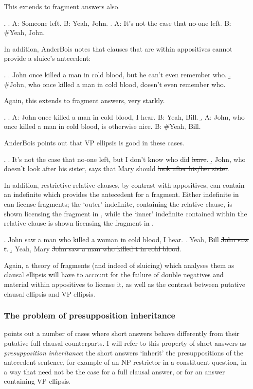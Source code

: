 \documentclass[doublespace]{umthesis}
\begin{document}
This extends to fragment answers also.

\ex. 	\a. A: Someone left. B: Yeah, John.
	\b. A: It's not the case that no-one left. B: \#Yeah, John.
	
In addition, AnderBois notes that clauses that are within appositives cannot provide a sluice's antecedent:
		
\ex. 		\label{appossluicing}
		\a. \label{appossluicinga}John once killed a man in cold blood, but he can't even remember who.
		\b. \label{appossluicingb}\#John, who once killed a man in cold blood, doesn't even remember who.

Again, this extends to fragment answers, very starkly.

\ex. 	\a. A: John once killed a man in cold blood, I hear. B: Yeah, Bill.
	\b. A: John, who once killed a man in cold blood, is otherwise nice. B: \#Yeah, Bill.

AnderBois points out that VP ellipsis is good in these cases.
  
  \ex. 	\a. It's not the case that no-one left, but I don't know who did \sout{leave}.
  	\b. John, who doesn't look after his sister, says that Mary should \sout{look after his/her sister}.

In addition, restrictive relative clauses, by contrast with appositives, can contain an indefinite which provides the antecedent for a fragment. Either indefinite in \Next can license fragments; the `outer' indefinite, containing the relative clause, is shown licensing the fragment in \Next[a], while the `inner' indefinite contained within the relative clause is shown licensing the fragment in \Next[b].

\ex. 	John saw a man who killed a woman in cold blood, I hear.
	\a. Yeah, Bill \sout{John saw t}.
	\b. Yeah, Mary \sout{John saw a man who killed t in cold blood}. 
	
 Again, a theory of fragments (and indeed of sluicing) which analyses them as clausal ellipsis will have to account for the failure of double negatives and material within appositives to license it, as well as the contrast between putative clausal ellipsis and VP ellipsis.
 
\subsubsection{The problem of presupposition inheritance}

\cite{Ja13} points out a number of cases where short answers behave differently from their putative full clausal counterparts. I will refer to this property of short answers as {\it presupposition inheritance}: the short answers `inherit' the presuppositions of the antecedent sentence, for example of an NP restrictor in a constituent question, in a way that need not be the case for a full clausal answer, or for an answer containing VP ellipsis.
\end{document}
